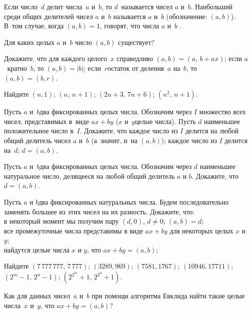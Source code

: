 \documentclass[a4paper,12pt]{article}
\begin{document}

Если число~$d$ делит числа~$a$ и~$b$, то $d$~называется  чисел $a$ и~$b$. Наибольший среди общих делителей чисел $a$ и~$b$ называется  $a$ и~$b$ (обозначение: $(a,b)$). В~том случае, когда $(a,b)=1$, говорят, что числа $a$ и~$b$ .

Для каких целых $a$ и~$b$ число $(a,b)$ существует?

Докажите, что
для каждого целого~$x$ справедливо $(a,b)=(a,\,b+ax)$;
если $a$~кратно~$b$, то $(a,b)=|b|$;
если~$r$\т остаток от деления~$a$ на~$b$, то $(a,b)=(b,r)$.

Найдите
$(n,1)$;
$(n,\,n+1)$;
$(2n+3,\,7n+6)$;
$(n^2,\,n+1)$.

Пусть $a$ и~$b$\т два фиксированных целых числа. Обозначим через $I$ множество всех чисел, представимых в~виде $ax+by$ ($x$ и~$y$\т целые числа). Пусть $d$\т
наименьшее положительное число в~$I$. Докажите, что
каждое число из $I$ делится на любой общий делитель чисел $a$ и~$b$ (а~значит, и~на $(a,b)$);
каждое число из $I$ делится на~$d$;
$d=(a,b)$.

Пусть $a$ и~$b$\т два фиксированных целых числа. Обозначим через $d$ наименьшее натуральное число, делящееся на любой общий делитель $a$ и $b$. Докажите, что $d=(a,b)$.


Пусть $a$ и $b$\т два фиксированных натуральных числа. Будем последовательно заменять большее из этих чисел на их разность. Докажите, что:\\
в некоторый момент мы получим пару $(d, 0)$, $d\ne 0$;
$(a,b)=d$;\\
все промежуточные числа представимы в виде $ax + by$ для некоторых целых $x$ и $y$;\\
найдутся целые числа $x$ и $y$, что $ax + by = (a,b)$;

Найдите
$(7\,777\,777,\,7\,777)$;
$(3289,969)$;
$(7581,1767)$;
$(10946,17711)$;\\
$(2^m-1,\,2^n-1)$;
$(2^{2^m}+1,\,2^{2^n}+1)$.

Как для данных чисел~$a$ и~$b$ при помощи алгоритма Евклида найти такие целые числа~$x$ и~$y$, что $ax+by=(a,b)$?
\end{document}
